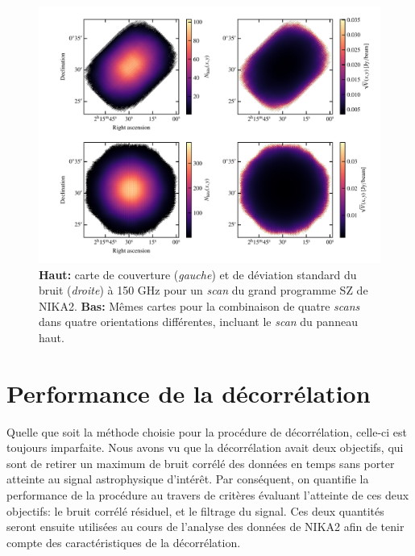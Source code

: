 \begin{figure}[t]
    \centering
    \includegraphics[width=\linewidth]{Figures/Chap_decor/scans.pdf}
    \caption{
        \textbf{Haut:} carte de couverture (\textit{gauche}) et de déviation standard du bruit (\textit{droite}) à 150 GHz pour un \textit{scan} du grand programme SZ de NIKA2.
        \textbf{Bas:} Mêmes cartes pour la combinaison de quatre \textit{scans} dans quatre orientations différentes, incluant le \textit{scan} du panneau haut.
    }
    \label{fig:nhits_std_maps}
\end{figure}

\section{Performance de la décorrélation}\label{sec:perf_decor}

Quelle que soit la méthode choisie pour la procédure de décorrélation, celle-ci est toujours imparfaite.
Nous avons vu que la décorrélation avait deux objectifs, qui sont de retirer un maximum de bruit corrélé des données en temps sans porter atteinte au signal astrophysique d'intérêt.
Par conséquent, on quantifie la performance de la procédure au travers de critères évaluant l'atteinte de ces deux objectifs: le bruit corrélé résiduel, et le filtrage du signal.
Ces deux quantités seront ensuite utilisées au cours de l'analyse des données de NIKA2 afin de tenir compte des caractéristiques de la décorrélation.

